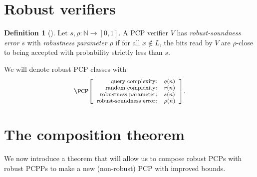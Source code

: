 \documentclass[english,12pt]{reedthesis}
\theoremstyle{plain}
\theoremstyle{definition}
\newtheorem{defn}[defn]{Definition}
\theoremstyle{remark}
\newcommand{\pcpr}[4]{%
  \ensuremath%
  \mleft[{\footnotesize\begin{array}{r l}
    \text{query complexity:} & #1 \\
    \text{random complexity:} & #2 \\
    \text{robustness parameter:} & #3 \\
    \text{robust-soundness error:} & #4
  \end{array}}\mright]%
}
\begin{document}
\section{Robust verifiers}\label{sec:robust-verifier}

\begin{defn}[{\cite[Def.\ 2.6]{BGHSV06}}]\label{def:robust-verifer}
  Let $s, \rho\colon \mathbb{N} \rightarrow [0, 1]$. A PCP verifier $V$ has
  \emph{robust-soundness error} $s$ with \emph{robustness parameter} $\rho$ if for
  all $x \notin L$, the bits read by $V$ are $\rho$-close to being accepted with
  probability strictly less than $s$.
\end{defn}

We will denote robust PCP classes with
\[
  \PCP\pcpr{q(n)}{r(n)}{s(n)}{\rho(n)}.
\]

\section{The composition theorem}\label{sec:comp-theorem}

We now introduce a theorem that will allow us to compose robust PCPs with robust
PCPPs to make a new (non-robust) PCP with improved bounds.
\end{document}
